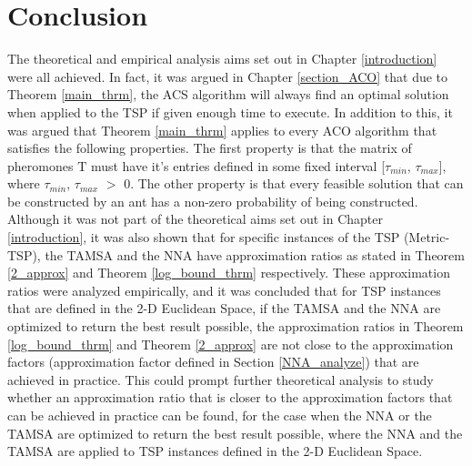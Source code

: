 \documentclass[12pt]{article}
\numberwithin{equation}{subsection}
\numberwithin{table}{subsection}
\numberwithin{algorithm}{subsection}
\numberwithin{figure}{subsection}
\begin{document}
\section{Conclusion}
The theoretical and empirical analysis aims set out in Chapter \ref{introduction} were all achieved. In fact, it was argued in Chapter \ref{section_ACO} that due to Theorem \ref{main_thrm}, the ACS algorithm will always find an optimal solution when applied to the TSP if given enough time to execute. In addition to this, it was argued that Theorem \ref{main_thrm} applies to every ACO algorithm that satisfies the following properties. The first property is that the matrix of pheromones $\mathrm{T}$ must have it's entries defined in some fixed interval [$\tau_{min}$, $\tau_{max}$], where $\tau_{min}$, $\tau_{max}$ $>$ 0. The other property is that every feasible solution that can be constructed by an ant has a non-zero probability of being constructed. Although it was not part of the theoretical aims set out in Chapter \ref{introduction}, it was also shown that for specific instances of the TSP (Metric-TSP), the TAMSA and the NNA have approximation ratios as stated in Theorem \ref{2_approx} and Theorem \ref{log_bound_thrm} respectively. These approximation ratios were analyzed empirically, and it was concluded that for TSP instances that are defined in the 2-D Euclidean Space, if the TAMSA and the NNA are optimized to return the best result possible, the approximation ratios in Theorem \ref{log_bound_thrm} and Theorem \ref{2_approx} are not close to the approximation factors  (approximation factor defined in Section \ref{NNA_analyze}) that are achieved in practice. This could prompt further theoretical analysis to study whether an approximation ratio that is closer to the approximation factors that can be achieved in practice can be found, for the case when the NNA or the TAMSA are optimized to return the best result possible, where the NNA and the TAMSA are applied to TSP instances defined in the 2-D Euclidean Space. \\\\
\end{document}
